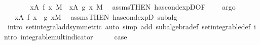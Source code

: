 \begin{isabellebody}
\ \ \isamarkupfalse%
\ \isamarkupfalse%
\ {\isachardoublequoteopen}{\isachardot}{\kern0pt}{\isachardot}{\kern0pt}{\isachardot}{\kern0pt}\ {\isacharequal}{\kern0pt}\ {\isacharparenleft}{\kern0pt}{\isasymintegral}x{\isasymin}A{\isachardot}{\kern0pt}\ f{\isacharprime}{\kern0pt}\ x\ {\isasympartial}M{\isacharparenright}{\kern0pt}\ {\isacharplus}{\kern0pt}\ {\isacharparenleft}{\kern0pt}{\isasymintegral}x{\isasymin}A{\isachardot}{\kern0pt}\ g{\isacharprime}{\kern0pt}\ x\ {\isasympartial}M{\isacharparenright}{\kern0pt}{\isachardoublequoteclose}\ \isamarkupfalse%
\ assms{\isacharbrackleft}{\kern0pt}THEN\ has{\isacharunderscore}{\kern0pt}cond{\isacharunderscore}{\kern0pt}expD{\isacharparenleft}{\kern0pt}{}{\isacharparenright}{\kern0pt}{\isacharbrackleft}{\kern0pt}OF\ {\isacharunderscore}{\kern0pt}\ {}{\isacharbrackright}{\kern0pt}{\isacharbrackright}{\kern0pt}\ \isamarkupfalse%
\ argo\isanewline
\ \ \isamarkupfalse%
\ \isamarkupfalse%
\ {\isachardoublequoteopen}{\isachardot}{\kern0pt}{\isachardot}{\kern0pt}{\isachardot}{\kern0pt}\ {\isacharequal}{\kern0pt}\ {\isasymintegral}x{\isasymin}A{\isachardot}{\kern0pt}\ {\isacharparenleft}{\kern0pt}f{\isacharprime}{\kern0pt}\ x\ {\isacharplus}{\kern0pt}\ g{\isacharprime}{\kern0pt}\ x{\isacharparenright}{\kern0pt}{\isasympartial}M{\isachardoublequoteclose}\ \isamarkupfalse%
\ assms{\isacharbrackleft}{\kern0pt}THEN\ has{\isacharunderscore}{\kern0pt}cond{\isacharunderscore}{\kern0pt}expD{\isacharparenleft}{\kern0pt}{}{\isacharparenright}{\kern0pt}{\isacharbrackright}{\kern0pt}\ subalg\ {}\ \isamarkupfalse%
\ {\isacharparenleft}{\kern0pt}intro\ set{\isacharunderscore}{\kern0pt}integral{\isacharunderscore}{\kern0pt}add{\isacharparenleft}{\kern0pt}{}{\isacharparenright}{\kern0pt}{\isacharbrackleft}{\kern0pt}symmetric{\isacharbrackright}{\kern0pt}{\isacharcomma}{\kern0pt}\ auto\ simp\ add{\isacharcolon}{\kern0pt}\ subalgebra{\isacharunderscore}{\kern0pt}def\ set{\isacharunderscore}{\kern0pt}integrable{\isacharunderscore}{\kern0pt}def\ intro{\isacharcolon}{\kern0pt}\ integrable{\isacharunderscore}{\kern0pt}mult{\isacharunderscore}{\kern0pt}indicator{\isacharparenright}{\kern0pt}\isanewline
\ \ \isamarkupfalse%
\ \isamarkupfalse%
\ {\isacharquery}{\kern0pt}case\ \isacommand{{\isachardot}{\kern0pt}}\isamarkupfalse%
\isanewline
{}\isamarkupfalse%
\isanewline
\ \ \isamarkupfalse%

\end{isabellebody}
